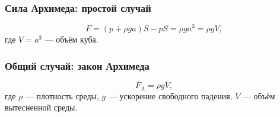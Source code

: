 \documentclass[12pt, a4paper]{article}
\begin{document}
\subsubsection*{Сила Архимеда: простой случай}

\[
F = (p+\rho ga)S - pS = \rho ga^3 = \rho gV,
\]
где \(V = a^3\) — объём куба.

\subsubsection*{Общий случай: закон Архимеда}

\[
F_A = \rho gV,
\]
где \(\rho\) — плотность среды, \(g\) — ускорение свободного падения, \(V\) — объём вытесненной среды.
\end{document}
